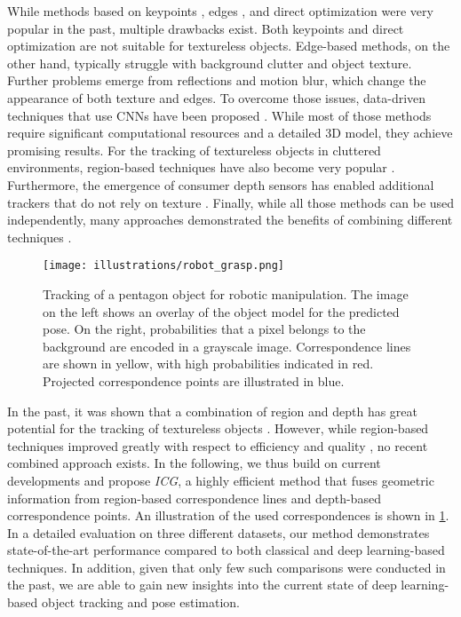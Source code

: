 \documentclass[10pt,twocolumn,letterpaper]{article}
\begin{document}
While methods based on keypoints \cite{Rublee2011, Ozuysal2006, Rosten2005, Skrypnyk2004, Vacchetti2004}, edges \cite{Seo2014, Comport2006, Drummond2002b, Harris1990}, and direct optimization \cite{Seo2016, Crivellaro2014, Benhimane2004, Lucas1981}
were very popular in the past, multiple drawbacks exist.
Both keypoints and direct optimization are not suitable for textureless objects.
Edge-based methods, on the other hand, typically struggle with background clutter and object texture.
Further problems emerge from reflections and motion blur, which change the appearance of both texture and edges.
To overcome those issues, data-driven techniques that use \acp{CNN} have been proposed \cite{Deng2021, Wen2020, Li2018, Wang2020}.
While most of those methods require significant computational resources and a detailed 3D model, they achieve promising results.
For the tracking of textureless objects in cluttered environments, region-based techniques have also become very popular \cite{Stoiber2021, Zhong2020, Tjaden2018, Prisacariu2012}.
Furthermore, the emergence of consumer depth sensors has enabled additional trackers that do not rely on texture \cite{Cifuentes2017, Issac2016, Schmidt2015, Wuethrich2013, Newcombe2011}.
Finally, while all those methods can be used independently, many approaches demonstrated the benefits of combining different techniques \cite{Ren2017, Kehl2017, Tan2017, Krainin2011}.\begin{figure}[t]
	\centering
	\texttt{[image: illustrations/robot\_grasp.png]}
	\caption{
		Tracking of a pentagon object for robotic manipulation.
		The image on the left shows an overlay of the object model for the predicted pose.
		On the right, probabilities that a pixel belongs to the background are encoded in a grayscale image.
		Correspondence lines are shown in yellow, with high probabilities indicated in red.
		Projected correspondence points are illustrated in blue.
	}\label{fig:in20}
\end{figure}

In the past, it was shown that a combination of region and depth has great potential for the tracking of textureless objects \cite{Ren2017, Kehl2017}.
However, while region-based techniques improved greatly with respect to efficiency and quality \cite{Stoiber2021, Stoiber2020b}, no recent combined approach exists.
In the following, we thus build on current developments and propose \textit{ICG}, a highly efficient method that fuses geometric information from region-based correspondence lines and depth-based correspondence points.
An illustration of the used correspondences is shown in \cref{fig:in20}.
In a detailed evaluation on three different datasets, our method demonstrates state-of-the-art performance compared to both classical and deep learning-based techniques.
In addition, given that only few such comparisons were conducted in the past, we are able to gain new insights into the current state of deep learning-based object tracking and pose estimation.
 
\end{document}
